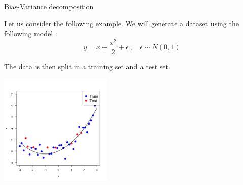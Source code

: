 \documentclass[11pt,compress,t,notes=noshow, xcolor=table]{beamer}
\begin{document}
\begin{vbframe} {Bias-Variance decomposition}











\framebreak

Let us consider the following example. We will generate a dataset using the following model : 
$$y = x + \frac{x^2}{2} + \epsilon  \ , \ \ \ \ \epsilon \sim 
N (0, 1)$$

The data is then split in a training set and a test set.

\begin{center}
  \includegraphics[width = 0.4\textwidth]{figure/bias_variance_decomposition-train_test.png}
\end{center}


\end{vbframe}
\end{document}
